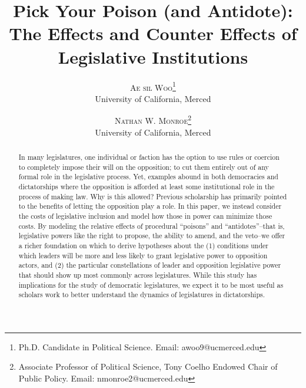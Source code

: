 \documentclass[12pt]{article}
\theoremstyle{plain}		      \newtheorem{assn}{Assumption}
\theoremstyle{plain}		      \newtheorem{prop}{Proposition}
\theoremstyle{plain}		      \newtheorem{lemma}{Lemma}
\theoremstyle{plain}	          \newtheorem{imp}{Implication}
\theoremstyle{plain}	          \newtheorem{hyp}{Hypothesis}
\theoremstyle{definition}		  \newtheorem{defn}{Definition}
\theoremstyle{remark}	          \newtheorem{rem}{Remark}
\theoremstyle{definition}         \newtheorem{case}{Case}
\begin{document}
\title{Pick Your Poison (and Antidote): The Effects and Counter Effects of Legislative Institutions%
}
\author{\Large \textsc{Ae sil Woo}\thanks{Ph.D. Candidate in Political Science. Email: awoo9@ucmerced.edu} \\
\normalsize University of California, Merced\\
\and
\Large \textsc{Nathan W. Monroe}\thanks{Associate Professor of Political Science, Tony Coelho Endowed Chair of Public Policy. Email: nmonroe2@ucmerced.edu} \\
\normalsize University of California, Merced} 
\date{ }


\maketitle
\thispagestyle{empty}


\begin{abstract}
\noindent \normalsize In many legislatures, one individual or faction has the option to use rules or coercion to completely impose their will on the opposition; to cut them entirely out of any formal role in the legislative process. Yet, examples abound in both democracies and dictatorships where the opposition is afforded at least some institutional role in the process of making law. Why is this allowed? Previous scholarship has primarily pointed to the benefits of letting the opposition play a role. In this paper, we instead consider the costs of legislative inclusion and model how those in power can minimize those costs. By modeling the relative effects of procedural ``poisons'' and ``antidotes''--that is, legislative powers like the right to propose, the ability to amend, and the veto--we offer a richer foundation on which to derive hypotheses about the (1) conditions under which leaders will be more and less likely to grant legislative power to opposition actors, and (2) the particular constellations of leader and opposition legislative power that should show up most commonly across legislatures. While this study has implications for the study of democratic legislatures, we expect it to be most useful as scholars work to better understand the dynamics of legislatures in dictatorships.
\end{abstract}
\newpage
\clearpage
{}
\doublespacing
\end{document}

